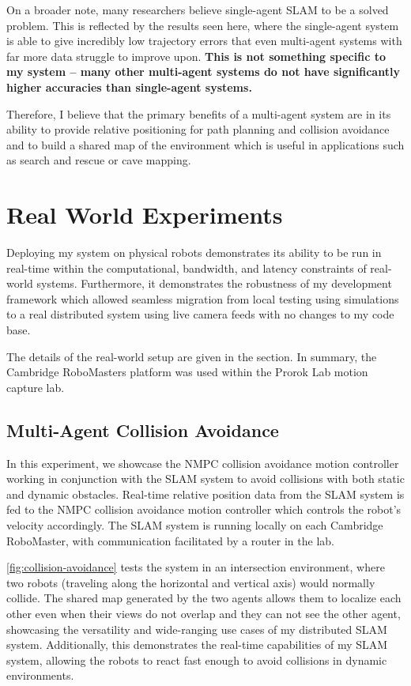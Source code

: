 On a broader note, many researchers believe single-agent SLAM to be a solved problem. This is reflected by the results seen here, where the single-agent system is able to give incredibly low trajectory errors that even multi-agent systems with far more data struggle to improve upon. \textbf{This is not something specific to my system – many other multi-agent systems do not have significantly higher accuracies than single-agent systems.}

Therefore, I believe that the primary benefits of a multi-agent system are in its ability to provide relative positioning for path planning and collision avoidance and to build a shared map of the environment which is useful in applications such as search and rescue or cave mapping.


\section{Real World Experiments}
\label{sec:real-world-experiments}
Deploying my system on physical robots demonstrates its ability to be run in real-time within the computational, bandwidth, and latency constraints of real-world systems. Furthermore, it demonstrates the robustness of my development framework which allowed seamless migration from local testing using simulations to a real distributed system using live camera feeds with no changes to my code base.

The details of the real-world setup are given in the  section. In summary, the Cambridge RoboMasters platform was used within the Prorok Lab motion capture lab.

\subsection{Multi-Agent Collision Avoidance}
\label{sec:multi-agent-collision-avoidance}
In this experiment, we showcase the NMPC collision avoidance motion controller working in conjunction with the SLAM system to avoid collisions with both static and dynamic obstacles. Real-time relative position data from the SLAM system is fed to the NMPC collision avoidance motion controller which controls the robot's velocity accordingly. The SLAM system is running locally on each Cambridge RoboMaster, with communication facilitated by a router in the lab.

\autoref{fig:collision-avoidance} tests the system in an intersection environment, where two robots (traveling along the horizontal and vertical axis) would normally collide. The shared map generated by the two agents allows them to localize each other even when their views do not overlap and they can not see the other agent, showcasing the versatility and wide-ranging use cases of my distributed SLAM system. Additionally, this demonstrates the real-time capabilities of my SLAM system, allowing the robots to react fast enough to avoid collisions in dynamic environments.

